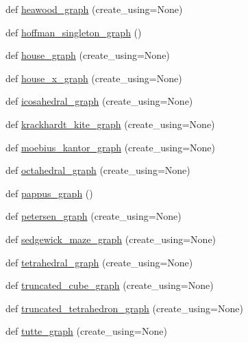 \begin{DoxyCompactItemize}
def \hyperlink{namespacenetworkx_1_1generators_1_1small_a372da1e74f54ec172b20279661b719d1}{heawood\+\_\+graph} (create\+\_\+using=None)
\item 
def \hyperlink{namespacenetworkx_1_1generators_1_1small_af038615a1594483ebf3312da6333a2cc}{hoffman\+\_\+singleton\+\_\+graph} ()
\item 
def \hyperlink{namespacenetworkx_1_1generators_1_1small_ab3fc4dd9c343320d58c746e5c319d401}{house\+\_\+graph} (create\+\_\+using=None)
\item 
def \hyperlink{namespacenetworkx_1_1generators_1_1small_a269cef6fe83cd6bc1a2821615b80e3aa}{house\+\_\+x\+\_\+graph} (create\+\_\+using=None)
\item 
def \hyperlink{namespacenetworkx_1_1generators_1_1small_ab63cbee2707f4887cd2aefe74483b0d3}{icosahedral\+\_\+graph} (create\+\_\+using=None)
\item 
def \hyperlink{namespacenetworkx_1_1generators_1_1small_ad3b314c43a6eb9df40aaddf4b25ab216}{krackhardt\+\_\+kite\+\_\+graph} (create\+\_\+using=None)
\item 
def \hyperlink{namespacenetworkx_1_1generators_1_1small_a7b91995e7baea9bd0bbec3b36b04ebe6}{moebius\+\_\+kantor\+\_\+graph} (create\+\_\+using=None)
\item 
def \hyperlink{namespacenetworkx_1_1generators_1_1small_a256a695fc4af9279f1f7c267ccd7c22a}{octahedral\+\_\+graph} (create\+\_\+using=None)
\item 
def \hyperlink{namespacenetworkx_1_1generators_1_1small_a2b77425edb186f321fef52042b94f9de}{pappus\+\_\+graph} ()
\item 
def \hyperlink{namespacenetworkx_1_1generators_1_1small_ac0e2149006478c7a1ca361fcf4d7c26c}{petersen\+\_\+graph} (create\+\_\+using=None)
\item 
def \hyperlink{namespacenetworkx_1_1generators_1_1small_a29d7fb36c94f9495208c28d6e4ec5eb2}{sedgewick\+\_\+maze\+\_\+graph} (create\+\_\+using=None)
\item 
def \hyperlink{namespacenetworkx_1_1generators_1_1small_a1dbc1073a79cd85d5ded996ff295a946}{tetrahedral\+\_\+graph} (create\+\_\+using=None)
\item 
def \hyperlink{namespacenetworkx_1_1generators_1_1small_a4968099cf040e651e3d5194b7337ae57}{truncated\+\_\+cube\+\_\+graph} (create\+\_\+using=None)
\item 
def \hyperlink{namespacenetworkx_1_1generators_1_1small_aab178045e3c9610ecd3b70b8cea8b308}{truncated\+\_\+tetrahedron\+\_\+graph} (create\+\_\+using=None)
\item 
def \hyperlink{namespacenetworkx_1_1generators_1_1small_a59657eaf647e09900a96d73e49061513}{tutte\+\_\+graph} (create\+\_\+using=None)
\end{DoxyCompactItemize}



